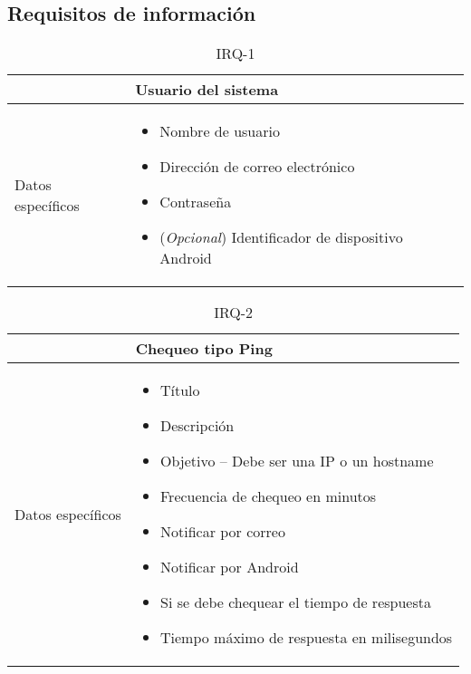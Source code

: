 \FloatBarrier
\subsection{Requisitos de información}
\label{sec:requisitos-informacion}


\begin{table}[h!]
  \centering
  \begin{tabularx}{\textwidth}{|l|X|}
    \hline

    & Usuario del sistema\\

    \hline
    Datos específicos &

    \begin{itemize}
    \item Nombre de usuario
    \item Dirección de correo electrónico
    \item Contraseña
    \item (\textit{Opcional}) Identificador de dispositivo Android
    \end{itemize}
    \\
    
    \hline
    
  \end{tabularx}
  \caption{IRQ-1}
\end{table}


\begin{table}[h!]
  \centering
  \begin{tabularx}{\textwidth}{|l|X|}
    \hline

    & Chequeo tipo Ping \\

    \hline
    Datos específicos &

    \begin{itemize}
      \item Título 
      \item Descripción
      \item Objetivo -- Debe ser una IP o un hostname
      \item Frecuencia de chequeo en minutos
      \item Notificar por correo
      \item Notificar por Android
      \item Si se debe chequear el tiempo de respuesta
      \item Tiempo máximo de respuesta en milisegundos
    \end{itemize}
    \\
    
    \hline
    
  \end{tabularx}
  \caption{IRQ-2}
\end{table}

